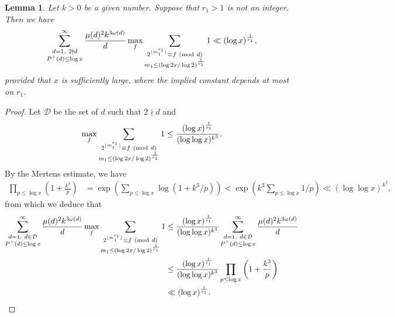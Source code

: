 \documentclass[12pt,a4paper,reqno]{amsart}
\numberwithin{equation}{section}
\def\pmod #1{\ ({\rm{mod}}\ #1)}
\theoremstyle{plain}
\newtheorem{lemma}{Lemma}
\theoremstyle{definition}
\begin{document}
\begin{lemma}\label{lem-4}
Let $k>0 $ be a given number. Suppose that $r_1>1$ is not an integer. Then we have
$$
\sum_{\substack{d=1,\ 2\nmid d \\P^+(d)\le \log x}}^{\infty}\frac{\mu(d)^2 k^{3\omega(d)}}{d}\max_{f}\sum_{\substack{2^{ \lfloor m_1^{r_1}\rfloor}\equiv f\pmod{d}\\ m_1\le (\log 2x/\log 2)^{\frac{1}{r_1}}}}1\ll 
(\log x)^{\frac{1}{r_1}},
$$
provided that $x$ is sufficiently large, where the implied constant depends at most on $r_1$.
\end{lemma}
\begin{proof}
Let $\mathcal{D}$ be the set of $d$ such that $2\nmid d$ and 
$$
\max_{f}\sum_{\substack{2^{ \lfloor m_1^{r_1}\rfloor}\equiv f\pmod{d}\\ m_1\le (\log 2x/\log 2)^{\frac{1}{r_1}}}}1 \le \frac{(\log x)^{\frac{1}{r_1}}}{(\log\log x)^{k^3}}.
$$
By the Mertens estimate, we have
\begin{align*}
\prod_{p\le \log x}\left(1+\frac{k^3}{p}\right)&=\exp\left(\sum_{p\le \log x}\log (1+k^3/p)\right)<\exp\left(k^3\sum_{p\le \log x}1/p\right)\ll (\log\log x)^{k^3},
\end{align*}
from which we deduce that
\begin{align*}
\sum_{\substack{d=1,\ d\in \mathcal{D} \\P^+(d)\le \log x}}^{\infty}\frac{\mu(d)^2 k^{3\omega(d)}}{d}\max_{f}\sum_{\substack{2^{ \lfloor m_1^{r_1}\rfloor}\equiv f\pmod{d}\\ m_1\le (\log 2x/\log 2)^{\frac{1}{r_1}}}}1  &\le \frac{(\log x)^{\frac{1}{r_1}}}{(\log\log x)^{k^3}}\sum_{\substack{d=1,\ d\in \mathcal{D} \\P^+(d)\le \log x}}^{\infty}\frac{\mu(d)^2 k^{3\omega(d)}}{d}\\
&\le \frac{(\log x)^{\frac{1}{r_1}}}{(\log\log x)^{k^3}}\prod_{p\le \log x}\left(1+\frac{k^3}{p}\right)\\
&\ll (\log x)^{\frac{1}{r_1}}.
\end{align*}


\end{proof}
\end{document}

